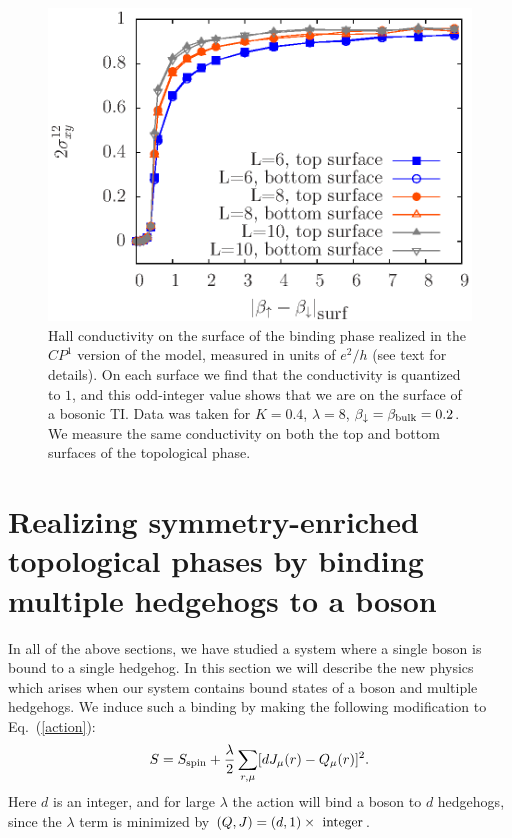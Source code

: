 \documentclass[prb,twocolumn]{revtex4-1}
\begin{document}
\begin{figure}
\includegraphics[width=\linewidth]{figures/cp1hall.eps}
\caption{Hall conductivity on the surface of the binding phase realized in the $CP^1$ version of the model, measured in units of $e^2/h$ (see text for details). On each surface we find that the conductivity is quantized to $1$, and this odd-integer value shows that we are on the surface of a bosonic TI. Data was taken for $K=0.4$, $\lambda=8$, $\beta_\downarrow=\beta_{\rm bulk}=0.2$. We measure the same conductivity on both the top and bottom surfaces of the topological phase.
}
\label{cp1hall}
\end{figure}


\section{Realizing symmetry-enriched topological phases by binding multiple hedgehogs to a boson}
\label{section::multiple}

In all of the above sections, we have studied a system where a single boson is bound to a single hedgehog. In this section we will describe the new physics which arises when our system contains bound states of a boson and multiple hedgehogs. We induce such a binding by making the following modification to Eq.~(\ref{action}):
\begin{equation}
S=S_{\rm spin}+\frac{\lambda}{2}\sum_{r,\mu} [ dJ_\mu(r)- Q_\mu(r)]^2.
\label{cdbind}
\end{equation}
Here $d$ is an integer, and for large $\lambda$ the action will bind a boson to $d$ hedgehogs, since the $\lambda$ term is minimized by $(Q, J) = (d, 1) \times~{\rm integer}$. 
\end{document}
